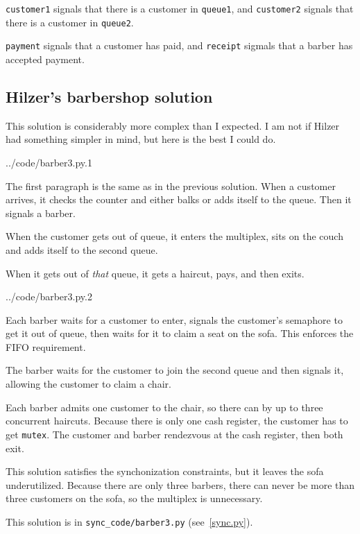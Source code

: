 \documentclass{book}
\newcommand{\clearemptydoublepage}{\newpage\cleardoublepage}
\begin{document}
{\tt customer1} signals that there is a customer in {\tt queue1}, and
{\tt customer2} signals that there is a customer in {\tt queue2}.

{\tt payment} signals that a customer has paid, and {\tt receipt}
sigmals that a barber has accepted payment.



\clearemptydoublepage
\subsection {Hilzer's barbershop solution}

This solution is considerably more complex than I expected.  I
am not if Hilzer had something simpler in mind, but here is the
best I could do.


{../code/barber3.py.1}

The first paragraph is the same as in the previous solution.  When
a customer arrives, it checks the counter and either balks or adds
itself to the queue.  Then it signals a barber.

When the customer gets out of queue, it enters the multiplex,
sits on the couch and adds itself to the second queue.

When it gets out of {\em that} queue, it gets a haircut, pays,
and then exits.


{../code/barber3.py.2}

Each barber waits for a customer to enter, signals the customer's
semaphore to get it out of queue, then waits for it to claim a seat
on the sofa.  This enforces the FIFO requirement.

The barber waits for the customer to join the second queue and then
signals it, allowing the customer to claim a chair.

Each barber admits one customer to the chair, so there can by up
to three concurrent haircuts.  Because there is only one cash
register, the customer has to get {\tt mutex}.  The customer
and barber rendezvous at the cash register, then both exit.

This solution satisfies the synchonization constraints, but it leaves
the sofa underutilized.  Because there are only three barbers, there
can never be more than three customers on the sofa, so the multiplex
is unnecessary.

This solution is in \verb"sync_code/barber3.py" (see~\ref{sync.py}).
\end{document}
